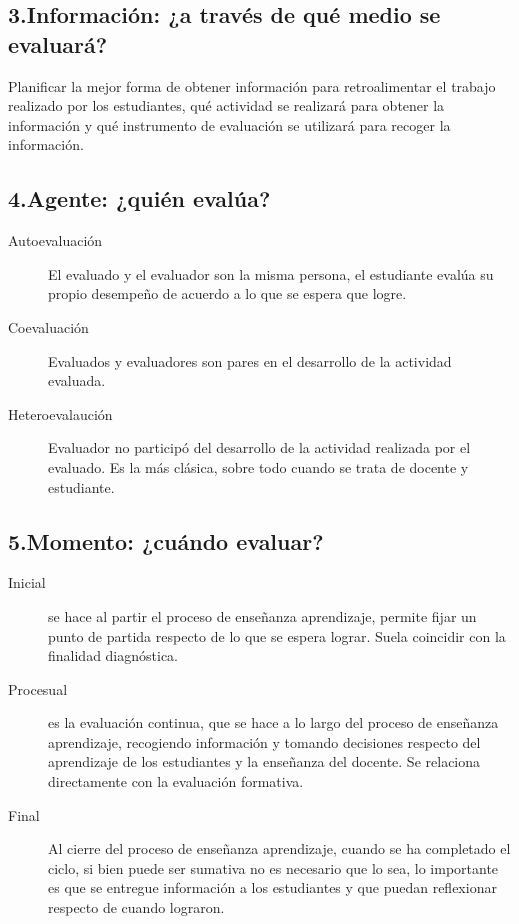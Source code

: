 \documentclass[12pt,letterpaper,article,x11names]{memoir}
\begin{document}
\subsection{3.Información: ¿a través de qué medio se evaluará?}
\label{sec:org05b0b6a}
Planificar la mejor forma de obtener información para retroalimentar el trabajo realizado por los estudiantes, qué actividad se realizará para obtener la información y qué instrumento de evaluación se utilizará para recoger la información.

\subsection{4.Agente: ¿quién evalúa?}
\label{sec:org919265d}
\begin{description}
\item[{Autoevaluación}] El evaluado y el evaluador son la misma persona, el estudiante evalúa su propio desempeño de acuerdo a lo que se espera que logre.
\item[{Coevaluación}] Evaluados y evaluadores son pares en el desarrollo de la actividad evaluada.
\item[{Heteroevalaución}] Evaluador no participó del desarrollo de la actividad realizada por el evaluado. Es la más clásica, sobre todo cuando se trata de docente y estudiante.
\end{description}

\subsection{5.Momento: ¿cuándo evaluar?}
\label{sec:orga4d4c5a}
\begin{description}
\item[{Inicial}] se hace al partir el proceso de enseñanza aprendizaje, permite fijar un punto de partida respecto de lo que se espera lograr. Suela coincidir con la finalidad diagnóstica.
\item[{Procesual}] es la evaluación continua, que se hace a lo largo del proceso de enseñanza aprendizaje, recogiendo información y tomando decisiones respecto del aprendizaje de los estudiantes y la enseñanza del docente. Se relaciona directamente con la evaluación formativa.
\item[{Final}] Al cierre del proceso de enseñanza aprendizaje, cuando se ha completado el ciclo, si bien puede ser sumativa no es necesario que lo sea, lo importante es que se entregue información a los estudiantes y que puedan reflexionar respecto de cuando lograron.
\end{description}
\end{document}
